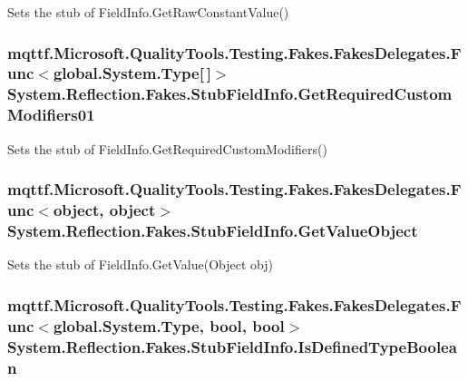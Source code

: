 Sets the stub of Field\-Info.\-Get\-Raw\-Constant\-Value()

\hypertarget{class_system_1_1_reflection_1_1_fakes_1_1_stub_field_info_a892f5fc48f583e3482a9a33f53576bcd}{
\subsubsection[{Get\-Required\-Custom\-Modifiers01}]{\setlength{\rightskip}{0pt plus 5cm}mqttf.\-Microsoft.\-Quality\-Tools.\-Testing.\-Fakes.\-Fakes\-Delegates.\-Func$<$global.\-System.\-Type\mbox{[}$\,$\mbox{]}$>$ System.\-Reflection.\-Fakes.\-Stub\-Field\-Info.\-Get\-Required\-Custom\-Modifiers01}}\label{class_system_1_1_reflection_1_1_fakes_1_1_stub_field_info_a892f5fc48f583e3482a9a33f53576bcd}


Sets the stub of Field\-Info.\-Get\-Required\-Custom\-Modifiers()

\hypertarget{class_system_1_1_reflection_1_1_fakes_1_1_stub_field_info_a0c060d909a8b5476213abab2214ad501}{
\subsubsection[{Get\-Value\-Object}]{\setlength{\rightskip}{0pt plus 5cm}mqttf.\-Microsoft.\-Quality\-Tools.\-Testing.\-Fakes.\-Fakes\-Delegates.\-Func$<$object, object$>$ System.\-Reflection.\-Fakes.\-Stub\-Field\-Info.\-Get\-Value\-Object}}\label{class_system_1_1_reflection_1_1_fakes_1_1_stub_field_info_a0c060d909a8b5476213abab2214ad501}


Sets the stub of Field\-Info.\-Get\-Value(\-Object obj)

\hypertarget{class_system_1_1_reflection_1_1_fakes_1_1_stub_field_info_accd8aad06c3c1175a0ce86b570ed6150}{
\subsubsection[{Is\-Defined\-Type\-Boolean}]{\setlength{\rightskip}{0pt plus 5cm}mqttf.\-Microsoft.\-Quality\-Tools.\-Testing.\-Fakes.\-Fakes\-Delegates.\-Func$<$global.\-System.\-Type, bool, bool$>$ System.\-Reflection.\-Fakes.\-Stub\-Field\-Info.\-Is\-Defined\-Type\-Boolean}}\label{class_system_1_1_reflection_1_1_fakes_1_1_stub_field_info_accd8aad06c3c1175a0ce86b570ed6150}


